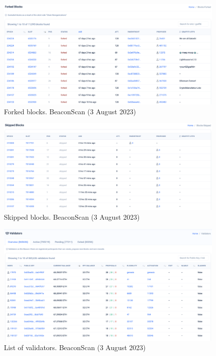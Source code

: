 \documentclass[UTF8]{article}
\begin{document}
\begin{figure}[htbp]
\begin{center}
\includegraphics[width=\linewidth]{images/beaconscan2}
\caption{Forked blocks. BeaconScan (3 August 2023)}
\label{fig:beaconscan2}
\end{center}
\end{figure}

\begin{figure}[htbp]
\begin{center}
\includegraphics[width=\linewidth]{images/beaconscan3}
\caption{Skipped blocks. BeaconScan (3 August 2023)}
\label{fig:beaconscan3}
\end{center}
\end{figure}

\begin{figure}[htbp]
\begin{center}
\includegraphics[width=\linewidth]{images/beaconscan4}
\caption{List of validators. BeaconScan (3 August 2023)}
\label{fig:beaconscan4}
\end{center}
\end{figure}
\end{document}
